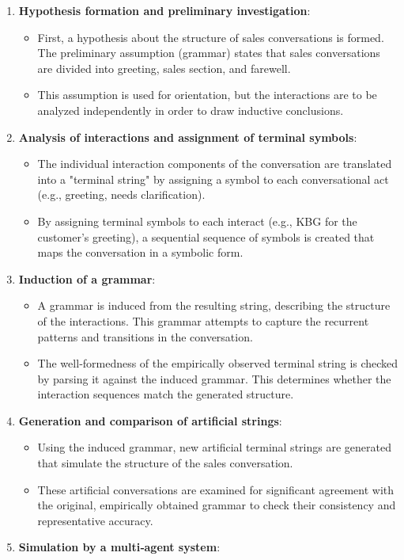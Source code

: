 \documentclass[
]{article}
\begin{document}
\begin{enumerate}
\def\labelenumi{\arabic{enumi}.}
\item
  \textbf{Hypothesis formation and preliminary investigation}:

  \begin{itemize}
  \item
    First, a hypothesis about the structure of sales conversations is formed. The preliminary assumption (grammar) states that sales conversations are divided into greeting, sales section, and farewell.
  \item
    This assumption is used for orientation, but the interactions are to be analyzed independently in order to draw inductive conclusions.
  \end{itemize}
\item
  \textbf{Analysis of interactions and assignment of terminal symbols}:

  \begin{itemize}
  \item
    The individual interaction components of the conversation are translated into a "terminal string" by assigning a symbol to each conversational act (e.g., greeting, needs clarification).
  \item
    By assigning terminal symbols to each interact (e.g., KBG for the customer's greeting), a sequential sequence of symbols is created that maps the conversation in a symbolic form.
  \end{itemize}
\item
  \textbf{Induction of a grammar}:

  \begin{itemize}
  \item
    A grammar is induced from the resulting string, describing the structure of the interactions. This grammar attempts to capture the recurrent patterns and transitions in the conversation.
  \item
    The well‑formedness of the empirically observed terminal string is checked by parsing it against the induced grammar. This determines whether the interaction sequences match the generated structure.
  \end{itemize}
\item
  \textbf{Generation and comparison of artificial strings}:

  \begin{itemize}
  \item
    Using the induced grammar, new artificial terminal strings are generated that simulate the structure of the sales conversation.
  \item
    These artificial conversations are examined for significant agreement with the original, empirically obtained grammar to check their consistency and representative accuracy.
  \end{itemize}
\item
  \textbf{Simulation by a multi‑agent system}:


\end{enumerate}
\end{document}
